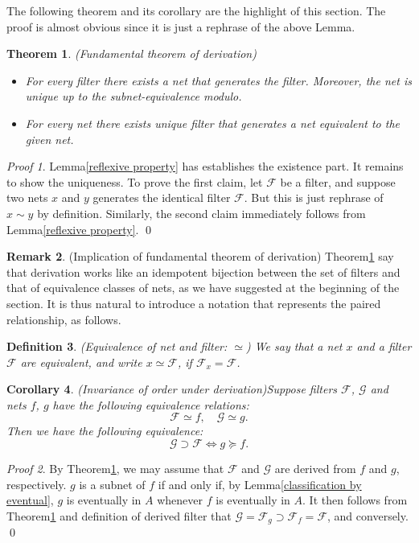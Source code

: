 \documentclass[a4paper,12pt]{article}
\newtheorem{thm}{Theorem}[section]
\newtheorem{cor}[thm]{Corollary}
\newtheorem{dfn}[thm]{Definition}
\theoremstyle{remark}
\newtheorem*{prf}{Proof}
\theoremstyle{definition}
\newtheorem{rem}[thm]{Remark}
\theoremstyle{definition}
\theoremstyle{definition}
\begin{document}
The following theorem and its corollary are the highlight of this section. The proof is almost obvious since it is just a rephrase of the above Lemma.
\begin{thm}\label{fundamental theorem of derivation} (Fundamental theorem of derivation)
	\begin{itemize}
		\item[(1)] For every filter there exists a net that generates the filter. Moreover, the net is unique up to the subnet-equivalence modulo.
		\item[(2)] For every net there exists unique filter that generates a net equivalent to the given net.
	\end{itemize}
\end{thm}
\begin{prf}
	Lemma\ref{reflexive property} has establishes the existence part. It remains to show the uniqueness.
	To prove the first claim, let \( \mathscr{F} \) be a filter, and suppose two nets \( x \) and \( y \) generates the identical filter \( \mathscr{F} \). But this is just rephrase of \( x \sim y \) by definition.
	Similarly, the second claim immediately follows from Lemma\ref{reflexive property}.
	\qed\end{prf}

\begin{rem} (Implication of fundamental theorem of derivation)
	Theorem\ref{fundamental theorem of derivation} say that derivation works like an idempotent bijection between the set of filters and that of equivalence classes of nets, as we have suggested at the beginning of the section. It is thus natural to introduce a notation that represents the paired relationship, as follows.
\end{rem}

\begin{dfn} (Equivalence of net and filter: \( \simeq \))
	We say that a net \( x \) and a filter \( \mathscr{F} \) are equivalent, and write \( x \simeq \mathscr{F} \), if \( \mathscr{F}_x = \mathscr{F} \).
\end{dfn}

\begin{cor} (Invariance of order under derivation)\label{invariance order}
	Suppose filters \( \mathscr{F} \), \( \mathscr{G} \) and nets \( f \), \( g \) have the following equivalence relations:
	\[
		\mathscr{F} \simeq f,\quad \mathscr{G} \simeq g.
	\]
	Then we have the following equivalence:
	\[
		\mathscr{G} \supset \mathscr{F} \iff g \succeq f.
	\]
\end{cor}
\begin{prf}
	By Theorem\ref{fundamental theorem of derivation}, we may assume that \( \mathscr{F} \) and \( \mathscr{G} \) are derived from \( f \) and \( g \), respectively. \( g \) is a subnet of \( f \) if and only if, by Lemma\ref{classification by eventual}, \( g \) is eventually in \( A \) whenever \( f \) is eventually in \( A \).
	It then follows from Theorem\ref{fundamental theorem of derivation} and definition of derived filter that \( \mathscr{G} = \mathscr{F}_g \supset \mathscr{F}_f = \mathscr{F} \), and conversely.
	\qed\end{prf}
\end{document}
